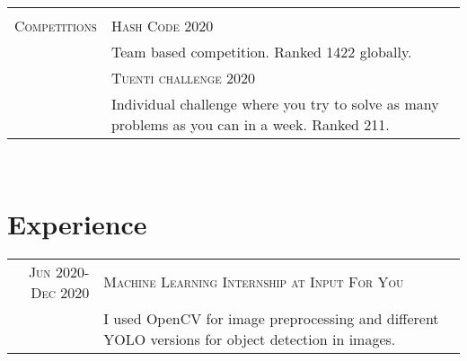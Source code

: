 \documentclass[a4paper,11pt]{article} %
\begin{document}
\begin{tabular}{p{3cm}|p{11cm}}
  \multicolumn{2}{c}{}                                                                                                                                                                                                                                                                \\
  \textsc{Competitions}                  & \textsc{Hash Code 2020}                                                                                                                                                                                                                    \\
                                         & \footnotesize Team based competition. Ranked 1422 globally.                                                                                                                                                                             \\
                                         & \textsc{Tuenti challenge 2020}                                                                                                                                                                                                             \\
                                         & \footnotesize Individual challenge where you try to solve as many problems as you can in a week. Ranked 211.
\end{tabular}\\


\section{Experience}

\begin{tabular}{r|p{11cm}}	
  \textsc{Jun 2020-Dec 2020}  & \textsc{Machine Learning Internship at Input For You} \\
  & \footnotesize I used OpenCV for image preprocessing and different YOLO versions for object detection in images.
\end{tabular}\\



\end{document}
